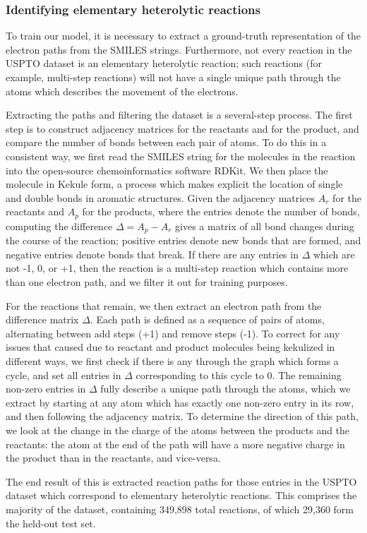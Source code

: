 \subsubsection{Identifying elementary heterolytic reactions}

To train our model, it is necessary to extract a ground-truth representation of the electron paths from the SMILES strings.
Furthermore, not every reaction in the USPTO dataset is an elementary heterolytic reaction; 
such reactions (for example, multi-step reactions) will not have a single unique path through the atoms 
which describes the movement of the electrons.

Extracting the paths and filtering the dataset is a several-step process.
The first step is to construct adjacency matrices for the reactants and for the product,
and compare the number of bonds between each pair of atoms.
To do this in a consistent way, we first read the SMILES string for the molecules in the reaction
into the open-source chemoinformatics software RDKit.
We then place the molecule in Kekule form, a process which makes explicit the location of single and double bonds in aromatic structures.
Given the adjacency matrices $A_r$ for the reactants and $A_p$ for the products,
where the entries denote the number of bonds,
computing the difference $\Delta = A_p - A_r$ gives a matrix of all bond changes during the course of the reaction;
positive entries denote new bonds that are formed, and negative entries denote bonds that break.
If there are any entries in $\Delta$ which are not -1, 0, or +1, then the reaction is a multi-step reaction
which contains more than one electron path, and we filter it out for training purposes.

For the reactions that remain, we then extract an electron path from the difference matrix $\Delta$.
Each path is defined as a sequence of pairs of atoms, alternating between add steps (+1) and remove steps (-1).
To correct for any issues that caused due to reactant and product molecules being kekulized in different ways,
we first check if there is any through the graph which forms a cycle, 
and set all entries in $\Delta$ corresponding to this cycle to 0.
The remaining non-zero entries in $\Delta$ fully describe a unique path through the atoms,
which we extract by starting at any atom which has exactly one non-zero entry in its row,
and then following the adjacency matrix.
To determine the direction of this path, we look at the change in the charge of the atoms
between the products and the reactants:
the atom at the end of the path will have a more negative charge in the product than in the reactants,
and vice-versa. 

The end result of this is extracted reaction paths for those entries in the USPTO dataset which 
correspond to elementary heterolytic reactions.
This comprises the majority of the dataset, containing 349,898 total reactions, of which 29,360 form the held-out test set.


